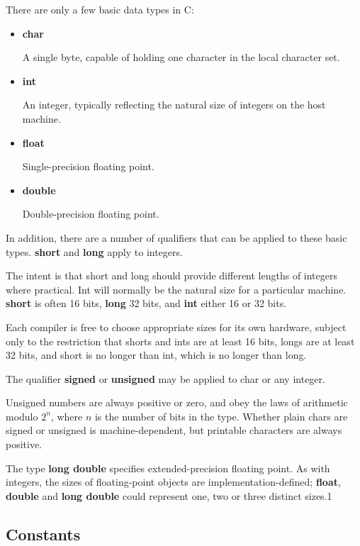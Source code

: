 \documentclass{article}
\begin{document}
There are only a few basic data types in C:

\begin{itemize}

\item \textbf{char}

	A single byte, capable of holding one character in the local character set.

\item \textbf{int}

	An integer, typically reflecting the natural size of integers on the host machine.

\item \textbf{float}

	Single-precision floating point.

\item \textbf{double}

	Double-precision floating point.
\end{itemize}


In addition, there are a number of qualifiers that can be applied to these basic types. \textbf{short} and \textbf{long} apply to integers.

The intent is that short and long should provide different lengths of integers where practical. Int will normally be the natural size for a particular machine. \textbf{short} is often 16 bits, \textbf{long} 32 bits, and \textbf{int} either 16 or 32 bits.

Each compiler is free to choose appropriate sizes for its own hardware, subject only to the restriction that shorts and ints are at least 16 bits, longs are at least 32 bits, and short is no longer than int, which is no longer than long.

The qualifier \textbf{signed} or \textbf{unsigned} may be applied to char or any integer.

Unsigned numbers are always positive or zero, and obey the laws of arithmetic modulo $2^n$, where $n$ is the number of bits in the type. Whether plain chars are signed or unsigned is machine-dependent, but printable characters are always positive.

The type \textbf{long double} specifies extended-precision floating point. As with integers, the sizes of floating-point objects are implementation-defined; \textbf{float}, \textbf{double} and \textbf{long double} could represent one, two or three distinct sizes.1

\clearpage
\subsection{Constants}
\end{document}
